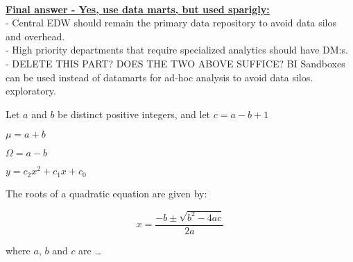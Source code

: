 \\\textbf{\color{red}{THIS TEXT NEEDS TO BE EXPANDED, CLEARER MOTIVATION AS TO OUR CONCLUSION BEING YES TO DATAMARTS }}
\textbf{\underline{Final answer - Yes, use data marts, but used sparigly:}}\\
- Central EDW should remain the primary data repository to avoid data silos and overhead.\\
- High priority departments that require specialized analytics should have DM:s.\\
- {\color{red} DELETE THIS PART? DOES THE TWO ABOVE SUFFICE?} BI Sandboxes can be used instead of datamarts for ad-hoc analysis to avoid data silos.
exploratory.

\newpage 
Let $a$ and $b$ be distinct positive integers, and let $c = a - b + 1$

$\mu = a + b $


$\Omega = a - b $

$y = c_2 x^2 + c_1 x + c_0 $

The roots of a quadratic equation are given by:

\begin{equation}
x = \frac{-b \pm \sqrt{b^2 - 4ac}} {2a}
\end{equation}

where $a$, $b$ and $c$ are \ldots

